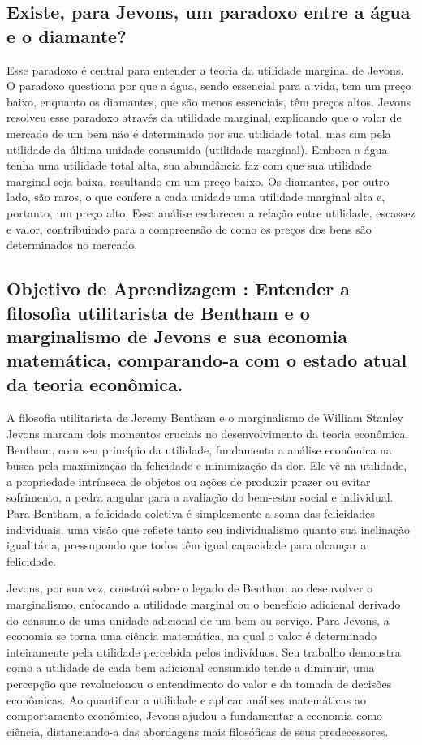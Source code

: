 \documentclass[12pt]{article}
\begin{document}
\subsection{\textbf{Existe, para Jevons, um paradoxo entre a água e o diamante?}}
Esse paradoxo é central para entender a teoria da utilidade marginal de Jevons. O paradoxo questiona por que a água, sendo essencial para a vida, tem um preço baixo, enquanto os diamantes, que são menos essenciais, têm preços altos. Jevons resolveu esse paradoxo através da utilidade marginal, explicando que o valor de mercado de um bem não é determinado por sua utilidade total, mas sim pela utilidade da última unidade consumida (utilidade marginal). Embora a água tenha uma utilidade total alta, sua abundância faz com que sua utilidade marginal seja baixa, resultando em um preço baixo. Os diamantes, por outro lado, são raros, o que confere a cada unidade uma utilidade marginal alta e, portanto, um preço alto. Essa análise esclareceu a relação entre utilidade, escassez e valor, contribuindo para a compreensão de como os preços dos bens são determinados no mercado.
\subsection{\textbf{Objetivo de Aprendizagem : Entender a filosofia utilitarista de Bentham e o marginalismo de Jevons e sua economia matemática, comparando-a com o estado atual da teoria econômica.}}
A filosofia utilitarista de Jeremy Bentham e o marginalismo de William Stanley Jevons marcam dois momentos cruciais no desenvolvimento da teoria econômica. Bentham, com seu princípio da utilidade, fundamenta a análise econômica na busca pela maximização da felicidade e minimização da dor. Ele vê na utilidade, a propriedade intrínseca de objetos ou ações de produzir prazer ou evitar sofrimento, a pedra angular para a avaliação do bem-estar social e individual. Para Bentham, a felicidade coletiva é simplesmente a soma das felicidades individuais, uma visão que reflete tanto seu individualismo quanto sua inclinação igualitária, pressupondo que todos têm igual capacidade para alcançar a felicidade.

Jevons, por sua vez, constrói sobre o legado de Bentham ao desenvolver o marginalismo, enfocando a utilidade marginal ou o benefício adicional derivado do consumo de uma unidade adicional de um bem ou serviço. Para Jevons, a economia se torna uma ciência matemática, na qual o valor é determinado inteiramente pela utilidade percebida pelos indivíduos. Seu trabalho demonstra como a utilidade de cada bem adicional consumido tende a diminuir, uma percepção que revolucionou o entendimento do valor e da tomada de decisões econômicas. Ao quantificar a utilidade e aplicar análises matemáticas ao comportamento econômico, Jevons ajudou a fundamentar a economia como ciência, distanciando-a das abordagens mais filosóficas de seus predecessores.
\end{document}
